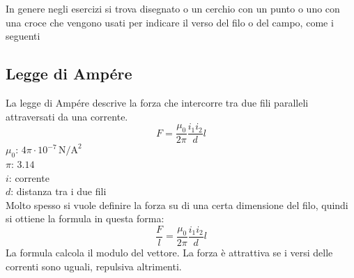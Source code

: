 In genere negli esercizi si trova disegnato o un cerchio con un punto o uno con una croce che
vengono usati per indicare il verso del filo o del campo, come i seguenti

\begin{center}
\end{center}

\subsection{Legge di Ampére}
La legge di Ampére descrive la forza che intercorre tra due fili paralleli attraversati da una
corrente.
\begin{equation*}
F = \frac{\mu_0}{2\pi}\frac{i_1i_2}{d}l
\end{equation*}
\hyperref[tab:mu0]{$\mu_0$}: $4\pi\cdot10^{-7}\,\text{N/A}^2$\\
\hyperref[tab:pi]{$\pi$}: $3.14$\\
$i$: corrente\\
$d$: distanza tra i due fili\\[\baselineskip]
Molto spesso si vuole definire la forza su di una certa dimensione del filo, quindi si ottiene
la formula in questa forma:
\begin{equation*}
\frac{F}{l} = \frac{\mu_0}{2\pi}\frac{i_1i_2}{d}l
\end{equation*}
La formula calcola il modulo del vettore. La forza è attrattiva se i versi delle correnti sono 
uguali, repulsiva altrimenti.

